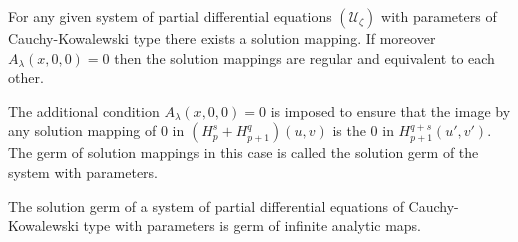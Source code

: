 \begin{theorem}\label{chap1:sec1.9:thm3}%
  For any given system of partial differential equations
  $(\mathscr{U}_\zeta)$ with parameters of Cauchy-Kowalewski type there
  exists a solution mapping. If moreover $A_\lambda (x, 0, 0) = 0$
  then the solution mappings are regular and equivalent to each
  other. 
\end{theorem}

The additional condition $A_\lambda (x, 0, 0) = 0$ is imposed to
ensure that the image by any solution mapping of $0$ in $(H^s_p +
H^q_{p+1}) (u, v)$ is the $0$ in $H^{q+s}_{p+1}(u', v')$. The germ of
solution mappings in this case is called the solution germ  of the
system with parameters. 

\begin{theorem}\label{chap1:sec1.9:thm4}%
  The solution germ of a system of partial differential equations of
  Cauchy-Kowalewski type with parameters is germ of infinite analytic
  maps. 
\end{theorem}

